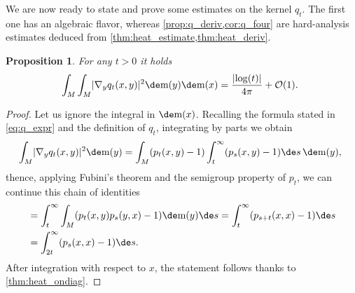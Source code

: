 \documentclass[JEP,XML,SOM,Unicode]{cedram}
\newcounter{results}[section]
\theoremstyle{plain}
\newtheorem{proposition}[results]{Proposition}
\theoremstyle{definition}
\numberwithin{equation}{section}
\newcommand{\bigo}{\ensuremath{\mathcal{O}}}
\renewcommand{\comma}{\ensuremath{\text{, }}}
\newcommand{\comma}{\ensuremath{\text{, }}}
\newcommand{\fullstop}{\ensuremath{\text{. }}}
\newcommand{\m}{\ensuremath{\mathrm m}}
\DeclarePairedDelimiter\abs{\lvert}{\rvert}
\begin{document}
We are now ready to state and prove some estimates on the kernel $q_t$.
The first one has an algebraic flavor, whereas \cref{prop:q_deriv,cor:q_four} are
hard-analysis estimates deduced from \cref{thm:heat_estimate,thm:heat_deriv}.

\begin{proposition}\label{prop:on_diag_int}
For any $t>0$ it holds
\begin{equation*}
\int_M\int_M \abs{\nabla_y q_t(x,y)}^2\de\m(y)\de\m(x)
= \frac{\abs{\log(t)}}{4\pi} + \bigo(1)\fullstop
\end{equation*}
\end{proposition}
\begin{proof}
Let us ignore the integral in $\de\m(x)$.
Recalling the formula stated in \cref{eq:q_expr} and the definition of $q_t$, integrating by parts we obtain
\begin{equation*}
\int_M \abs{\nabla_y q_t(x,y)}^2\de\m(y)
= \int_M (p_t(x,y)-1)\int_t^{\infty}(p_s(x,y)-1)\de s\,\de\m(y) \comma
\end{equation*}
thence, applying Fubini's theorem and the semigroup property of $p_t$, we can continue this
chain of identities
\begin{align*}
&=\int_t^{\infty}\int_M (p_t(x,y)p_s(y, x)-1)\de\m(y)\de s
=\int_t^{\infty}(p_{s+t}(x,x)-1)\de s \\
&=\int_{2t}^{\infty}(p_s(x,x)-1)\de s \fullstop
\end{align*}
After integration with respect to $x$, the statement follows thanks to \cref{thm:heat_ondiag}.
\end{proof}
\end{document}
